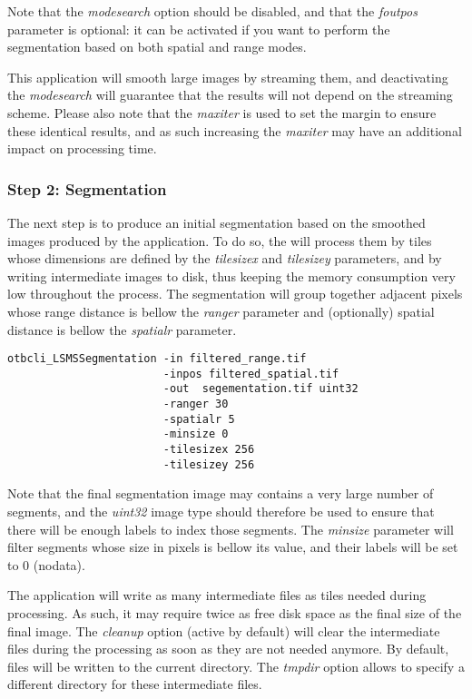 Note that the \emph{modesearch} option should be disabled, and
that the \emph{foutpos} parameter is optional: it can be activated
if you want to perform the segmentation based on both spatial and
range modes.

This application will smooth large images by streaming them, and
deactivating the \emph{modesearch} will guarantee that the results
will not depend on the streaming scheme. Please also note that the
\emph{maxiter} is used to set the margin to ensure these
identical results, and as such increasing the \emph{maxiter} may
have an additional impact on processing time.

\subsubsection{Step 2: Segmentation}

The next step is to produce an initial segmentation based on the
smoothed images produced by the 
application. To do so, the  will process
them by tiles whose dimensions are defined by the
\emph{tilesizex} and \emph{tilesizey} parameters, and by
writing intermediate images to disk, thus keeping the memory
consumption very low throughout the process. The segmentation will
group together adjacent pixels whose range distance is bellow the
\emph{ranger} parameter and (optionally) spatial distance is
bellow the \emph{spatialr} parameter.

\begin{verbatim}
otbcli_LSMSSegmentation -in filtered_range.tif
                        -inpos filtered_spatial.tif
                        -out  segementation.tif uint32 
                        -ranger 30 
                        -spatialr 5 
                        -minsize 0 
                        -tilesizex 256 
                        -tilesizey 256
\end{verbatim}

Note that the final segmentation image may contains a very large
number of segments, and the \emph{uint32} image type should
therefore be used to ensure that there will be enough labels to index
those segments. The \emph{minsize} parameter will filter segments
whose size in pixels is bellow its value, and their labels will be set
to 0 (nodata). 

The  application will write as many
intermediate files as tiles needed during processing. As such, it may
require twice as free disk space as the final size of the final
image. The \emph{cleanup} option (active by default) will clear the
intermediate files during the processing as soon as they are not
needed anymore. By default, files will be written to the current
directory. The \emph{tmpdir} option allows to specify a different
directory for these intermediate files.

